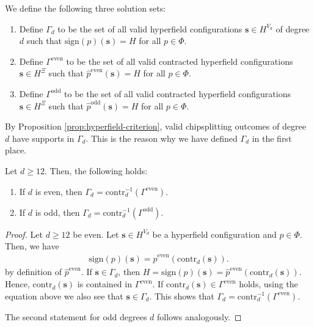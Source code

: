\begin{definition}
    We define the following three solution sets:
    \begin{enumerate}
        \item     Define \( \Gamma_d \) to be the set of all valid hyperfield configurations \( \mathbf{s} \in H^{V_d} \) of degree \( d \) such that \( \mathrm{sign}(p)(\mathbf{s}) = H \) for all \( p \in \Phi \).

        \item     Define \( \Gamma^{\mathrm{even}} \) to be the set of all valid contracted hyperfield configurations \( \mathbf{s} \in H^{\Xi} \) such that \( \hat p^{\mathrm{even}}(\mathbf{s}) = H \) for all \( p \in \Phi \).

        \item     Define \( \Gamma^{\mathrm{odd}} \) to be the set of all valid contracted hyperfield configurations \( \mathbf{s} \in H^{\Xi} \) such that \( \hat p^{\mathrm{odd}}(\mathbf{s}) = H \) for all \( p \in \Phi \).
    \end{enumerate}
\end{definition}

By Proposition \ref{prop:hyperfield-criterion}, valid chipsplitting outcomes of degree \( d \) have supports in \( \Gamma_d \). This is the reason why we have defined \( \Gamma_d \) in the first place. 

\begin{proposition}
    Let \( d \geq 12 \). Then, the following holds:
    \begin{enumerate}
        \item If \( d \) is even, then \( \Gamma_d = \mathrm{contr}_d^{-1}(\Gamma^{\mathrm{even}}) \).
       \item If \( d \) is odd, then \( \Gamma_d = \mathrm{contr}_d^{-1}(\Gamma^{\mathrm{odd}}) \).
    \end{enumerate}
\end{proposition}

\begin{proof}
    Let \( d \geq 12 \) be even. Let \( \mathbf{s} \in {H}^{V_d} \) be a hyperfield configuration and \( p \in \Phi \). Then, we have 
    \begin{align*}
        \mathrm{sign}(p)(\mathbf{s}) = \hat p^{\mathrm{even}}(\mathrm{contr}_d(\mathbf{s})).
    \end{align*}
    by definition of \( \hat p^{\mathrm{even}} \). If \( \mathbf{s} \in \Gamma_d \), then \( H = \mathrm{sign}(p)(\mathbf{s}) = \hat p^{\mathrm{even}}(\mathrm{contr}_d(\mathbf{s})) \). Hence, \( \mathrm{contr}_d(\mathbf{s}) \) is contained in \( \Gamma^{\mathrm{even}} \). If \( \mathrm{contr}_d(\mathbf{s}) \in \Gamma^{\mathrm{even}} \) holds, using the equation above we also see that \( \mathbf{s} \in \Gamma_d \). This shows that \( \Gamma_d = \mathrm{contr}_d^{-1}(\Gamma^{\mathrm{even}}) \).

    The second statement for odd degrees \( d \) follows analogously.
\end{proof}

